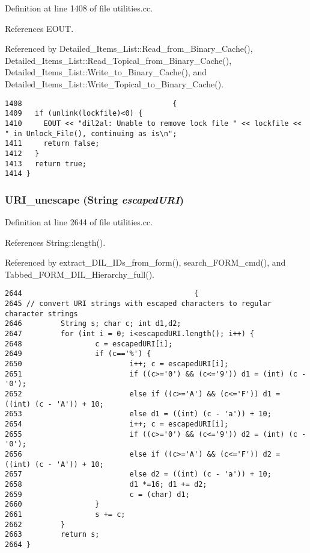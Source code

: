 Definition at line 1408 of file utilities.cc.

References EOUT.

Referenced by Detailed\_\-Items\_\-List::Read\_\-from\_\-Binary\_\-Cache(), Detailed\_\-Items\_\-List::Read\_\-Topical\_\-from\_\-Binary\_\-Cache(), Detailed\_\-Items\_\-List::Write\_\-to\_\-Binary\_\-Cache(), and Detailed\_\-Items\_\-List::Write\_\-Topical\_\-to\_\-Binary\_\-Cache().



\footnotesize\begin{verbatim}1408                                   {
1409   if (unlink(lockfile)<0) {
1410     EOUT << "dil2al: Unable to remove lock file " << lockfile << " in Unlock_File(), continuing as is\n";
1411     return false;
1412   }
1413   return true;
1414 }
\end{verbatim}\normalsize 
{}
\subsubsection{ URI\_\-unescape ({\bf String} {\em escaped\-URI})}\label{utilities_8cc_a79}




Definition at line 2644 of file utilities.cc.

References String::length().

Referenced by extract\_\-DIL\_\-IDs\_\-from\_\-form(), search\_\-FORM\_\-cmd(), and Tabbed\_\-FORM\_\-DIL\_\-Hierarchy\_\-full().



\footnotesize\begin{verbatim}2644                                        {
2645 // convert URI strings with escaped characters to regular character strings
2646         String s; char c; int d1,d2;
2647         for (int i = 0; i<escapedURI.length(); i++) {
2648                 c = escapedURI[i];
2649                 if (c=='%') {
2650                         i++; c = escapedURI[i];
2651                         if ((c>='0') && (c<='9')) d1 = (int) (c - '0');
2652                         else if ((c>='A') && (c<='F')) d1 = ((int) (c - 'A')) + 10;
2653                         else d1 = ((int) (c - 'a')) + 10;
2654                         i++; c = escapedURI[i];
2655                         if ((c>='0') && (c<='9')) d2 = (int) (c - '0');
2656                         else if ((c>='A') && (c<='F')) d2 = ((int) (c - 'A')) + 10;
2657                         else d2 = ((int) (c - 'a')) + 10;
2658                         d1 *=16; d1 += d2;
2659                         c = (char) d1;
2660                 }
2661                 s += c;
2662         }
2663         return s;
2664 }
\end{verbatim}\normalsize 
{}

